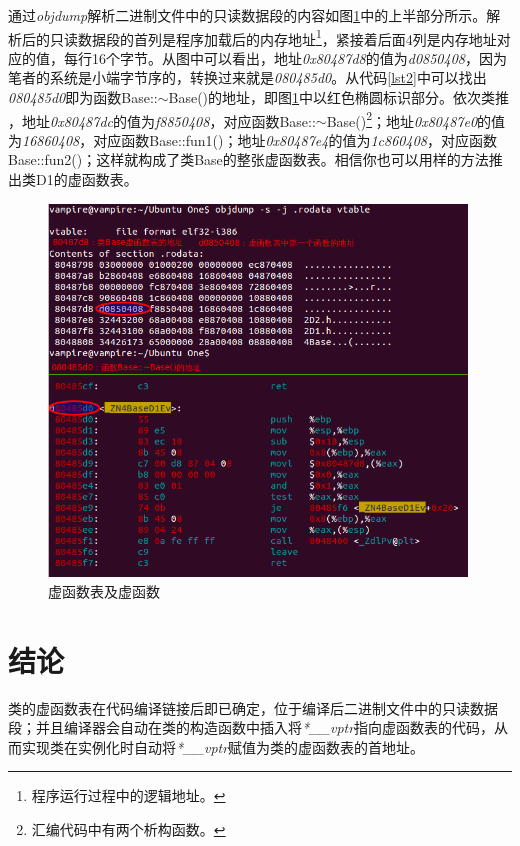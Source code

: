\documentclass[a4paper, 11pt, titlepage]{article}
\begin{document}
通过\emph{objdump}解析二进制文件中的只读数据段的内容如图\ref{fig3}中的上半部分所示。解析后的只读数据段的首列是程序加载后的内存地址\footnote{程序运行过程中的逻辑地址。}，紧接着后面4列是内存地址对应的值，每行16个字节。从图中可以看出，地址\emph{0x80487d8}的值为\emph{{\color{blue}d0850408}}，因为笔者的系统是小端字节序的，转换过来就是\emph{{\color{blue}080485d0}}。从代码\ref{lst2}中可以找出\emph{{\color{blue}080485d0}}即为函数Base::$\sim$Base()的地址，即图\ref{fig3}中以红色椭圆标识部分。依次类推 ，地址\emph{0x80487dc}的值为\emph{{\color{blue}f8850408}}，对应函数Base::$\sim$Base()\footnote{汇编代码中有两个析构函数。}；地址\emph{0x80487e0}的值为\emph{{\color{blue}16860408}}，对应函数Base::fun1()；地址\emph{0x80487e4}的值为\emph{{\color{blue}1c860408}}，对应函数Base::fun2()；这样就构成了类Base的整张虚函数表。相信你也可以用样的方法推出类D1的虚函数表。
\begin{figure}[!htb]
  \setlength{\abovecaptionskip}{0pt}
  \centering
  \includegraphics[width=0.99\textwidth]{fig/vptr.png}
  \caption{虚函数表及虚函数}
  \label{fig3}
\end{figure}

\section{结论}
类的虚函数表在代码编译链接后即已确定，位于编译后二进制文件中的只读数据段；并且编译器会自动在类的构造函数中插入将\emph{*\_\_vptr}指向虚函数表的代码，从而实现类在实例化时自动将\emph{*\_\_vptr}赋值为类的虚函数表的首地址。

\end{document}
